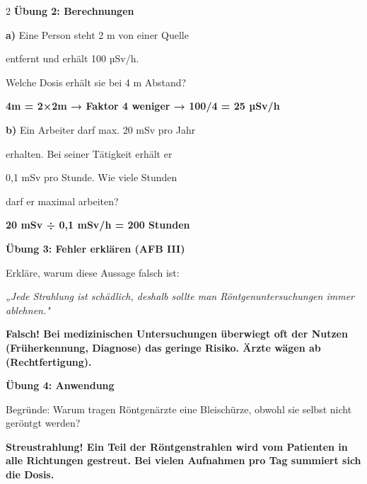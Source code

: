 \documentclass[10pt, a4paper]{article}
\newcommand{\fachfarbe}{physik}
\newcommand{\lsg}[1]{\textcolor{loesung}{\textbf{#1}}}
\newcommand{\abschnitt}[1]{%
    \vspace{8pt}\noindent\textbf{\textcolor{\fachfarbe}{#1}}\vspace{4pt}
}
\begin{document}
\begin{multicols}{2}
\abschnitt{Übung 2: Berechnungen}

\textbf{a)} Eine Person steht 2 m von einer Quelle

entfernt und erhält 100 µSv/h.

Welche Dosis erhält sie bei 4 m Abstand?

\vspace{4pt}
\lsg{4m = 2×2m → Faktor 4 weniger → 100/4 = 25 µSv/h}

\vspace{6pt}

\textbf{b)} Ein Arbeiter darf max. 20 mSv pro Jahr

erhalten. Bei seiner Tätigkeit erhält er

0,1 mSv pro Stunde. Wie viele Stunden

darf er maximal arbeiten?

\vspace{4pt}
\lsg{20 mSv ÷ 0,1 mSv/h = 200 Stunden}

\vspace{8pt}


\abschnitt{Übung 3: Fehler erklären (AFB III)}

\begin{fehlerbox}
Erkläre, warum diese Aussage falsch ist:

\vspace{4pt}

\textit{„Jede Strahlung ist schädlich, deshalb sollte man Röntgenuntersuchungen immer ablehnen."}

\vspace{4pt}
\lsg{Falsch! Bei medizinischen Untersuchungen überwiegt oft der Nutzen (Früherkennung, Diagnose) das geringe Risiko. Ärzte wägen ab (Rechtfertigung).}
\end{fehlerbox}

\vspace{8pt}


\abschnitt{Übung 4: Anwendung}

Begründe: Warum tragen Röntgenärzte eine Bleischürze, obwohl sie selbst nicht geröntgt werden?

\vspace{4pt}
\lsg{Streustrahlung! Ein Teil der Röntgenstrahlen wird vom Patienten in alle Richtungen gestreut. Bei vielen Aufnahmen pro Tag summiert sich die Dosis.}

\end{multicols}
\end{document}
